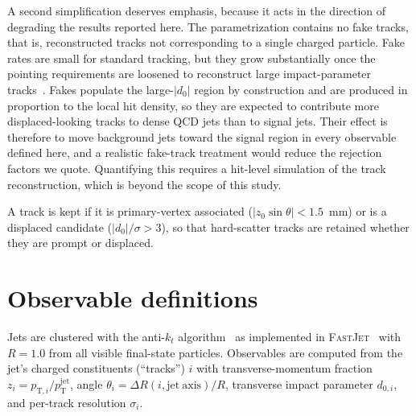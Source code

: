 \documentclass[a4paper,11pt]{article}
\newcommand{\dnought}{d_0}
\newcommand{\dR}{\Delta R}
\newcommand{\pT}{p_{\mathrm{T}}}
\begin{document}
A second simplification deserves emphasis, because it acts in the
direction of degrading the results reported here. The parametrization
contains no fake tracks, that is, reconstructed tracks not
corresponding to a single charged particle. Fake rates are small for
standard tracking, but they grow substantially once the pointing
requirements are loosened to reconstruct large impact-parameter
tracks~\cite{ATLAS:LRT}. Fakes populate the large-$|\dnought|$ region
by construction and are produced in proportion to the local hit
density, so they are expected to contribute more displaced-looking
tracks to dense QCD jets than to signal jets. Their effect is
therefore to move background jets toward the signal region in every
observable defined here, and a realistic fake-track treatment would
reduce the rejection factors we quote. Quantifying this requires a
hit-level simulation of the track reconstruction, which is beyond the
scope of this study.

A track is kept if it is primary-vertex associated
($|z_0 \sin\theta| < 1.5$~mm) or is a displaced candidate
($|\dnought|/\sigma > 3$), so that hard-scatter tracks are retained
whether they are prompt or displaced.



\section{Observable definitions}
\label{sec:observables}

Jets are clustered with the anti-$k_t$ algorithm~\cite{Cacciari:2008gp}
as implemented in \textsc{FastJet}~\cite{Cacciari:2011ma}
with $R = 1.0$ from all visible final-state particles. Observables are
computed from the jet's charged constituents (``tracks'') $i$ with
transverse-momentum fraction $z_i = p_{\mathrm{T},i} / \pT^{\mathrm{jet}}$, angle
$\theta_i = \dR(i, \mathrm{jet\ axis})/R$, transverse impact parameter
$d_{0,i}$, and per-track resolution $\sigma_i$.
\end{document}
